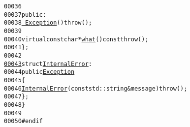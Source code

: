 \begin{footnotesize}
\begin{alltt}
00036 
00037         \textcolor{keyword}{public}:
00038             \hyperlink{classeos_1_1Exception_a8cb6faea0484cc58c472da9e58c7c30a}{~Exception}() \textcolor{keywordflow}{throw} ();
00039 
00040             \textcolor{keyword}{virtual} \textcolor{keyword}{const} \textcolor{keywordtype}{char} * \hyperlink{classeos_1_1Exception_adce7a2af080165b09a599bb13438a8e1}{what}() \textcolor{keyword}{const} \textcolor{keywordflow}{throw} ();
00041     \};
00042 
\hypertarget{exception_8hh_source_l00043}{}\hyperlink{structeos_1_1InternalError}{00043}     \textcolor{keyword}{struct }\hyperlink{structeos_1_1InternalError}{InternalError} :
00044         \textcolor{keyword}{public} \hyperlink{classeos_1_1Exception}{Exception}
00045     \{
00046         \hyperlink{structeos_1_1InternalError_ae4b3f79d99d58833babeb1e743853390}{InternalError}(\textcolor{keyword}{const} std::string & message) \textcolor{keywordflow}{throw} ();
00047     \};
00048 \}
00049 
00050 \textcolor{preprocessor}{#endif}
\end{alltt}\end{footnotesize}
